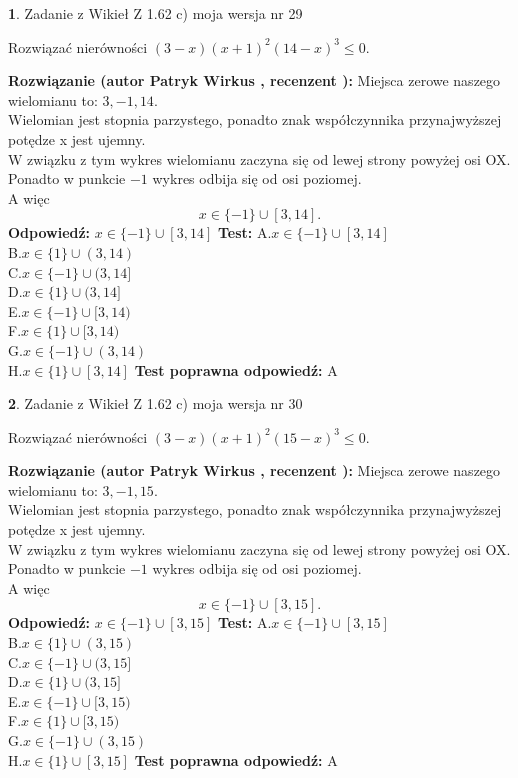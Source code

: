 \documentclass[12pt, a4paper]{article}
\theoremstyle{definition} %
\newtheorem{zad}{}
\newcommand{\zadStart}[1]{\begin{zad}#1\newline}
\newcommand{\zadStop}{\end{zad}}
\newcommand{\rozwStart}[2]{\noindent \textbf{Rozwiązanie (autor #1 , recenzent #2): }\newline}
\newcommand{\rozwStop}{\newline}
\newcommand{\odpStart}{\noindent \textbf{Odpowiedź:}\newline}
\newcommand{\odpStop}{\newline}
\newcommand{\testStart}{\noindent \textbf{Test:}\newline}
\newcommand{\testStop}{\newline}
\newcommand{\kluczStart}{\noindent \textbf{Test poprawna odpowiedź:}\newline}
\newcommand{\kluczStop}{\newline}
\begin{document}
\zadStart{Zadanie z Wikieł Z 1.62 c) moja wersja nr 29}

Rozwiązać nierówności $(3-x)(x+1)^{2}(14-x)^{3}\le0$.
\zadStop
\rozwStart{Patryk Wirkus}{}
Miejsca zerowe naszego wielomianu to: $3, -1, 14$.\\
Wielomian jest stopnia parzystego, ponadto znak współczynnika przy\linebreak najwyższej potędze x jest ujemny.\\ W związku z tym wykres wielomianu zaczyna się od lewej strony powyżej osi OX.\\
Ponadto w punkcie $-1$ wykres odbija się od osi poziomej.\\
A więc $$x \in \{-1\} \cup [3,14].$$
\rozwStop
\odpStart
$x \in \{-1\} \cup [3,14]$
\odpStop
\testStart
A.$x \in \{-1\} \cup [3,14]$\\
B.$x \in \{1\} \cup (3,14)$\\
C.$x \in \{-1\} \cup (3,14]$\\
D.$x \in \{1\} \cup (3,14]$\\
E.$x \in \{-1\} \cup [3,14)$\\
F.$x \in \{1\} \cup [3,14)$\\
G.$x \in \{-1\} \cup (3,14)$\\
H.$x \in \{1\} \cup [3,14]$
\testStop
\kluczStart
A
\kluczStop



\zadStart{Zadanie z Wikieł Z 1.62 c) moja wersja nr 30}

Rozwiązać nierówności $(3-x)(x+1)^{2}(15-x)^{3}\le0$.
\zadStop
\rozwStart{Patryk Wirkus}{}
Miejsca zerowe naszego wielomianu to: $3, -1, 15$.\\
Wielomian jest stopnia parzystego, ponadto znak współczynnika przy\linebreak najwyższej potędze x jest ujemny.\\ W związku z tym wykres wielomianu zaczyna się od lewej strony powyżej osi OX.\\
Ponadto w punkcie $-1$ wykres odbija się od osi poziomej.\\
A więc $$x \in \{-1\} \cup [3,15].$$
\rozwStop
\odpStart
$x \in \{-1\} \cup [3,15]$
\odpStop
\testStart
A.$x \in \{-1\} \cup [3,15]$\\
B.$x \in \{1\} \cup (3,15)$\\
C.$x \in \{-1\} \cup (3,15]$\\
D.$x \in \{1\} \cup (3,15]$\\
E.$x \in \{-1\} \cup [3,15)$\\
F.$x \in \{1\} \cup [3,15)$\\
G.$x \in \{-1\} \cup (3,15)$\\
H.$x \in \{1\} \cup [3,15]$
\testStop
\kluczStart
A
\kluczStop
\end{document}
